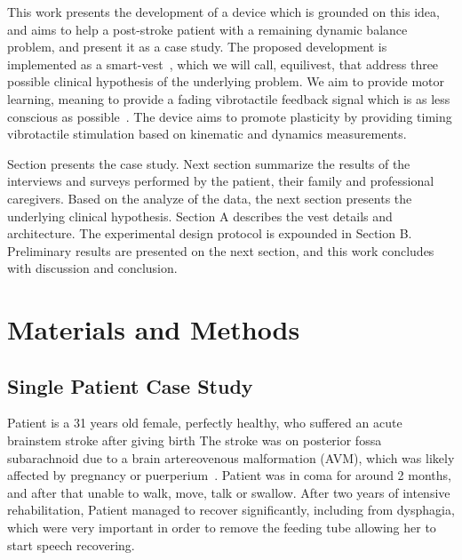 \documentclass[conference]{IEEEtran}
\begin{document}
This work presents the development of a device which is grounded on this idea, and aims to help a post-stroke patient with a remaining dynamic balance problem, and present it as a case study.  The proposed development is implemented as a smart-vest~\cite{Brandebusemeyer.etal2021}, which we will call, equilivest, that address three possible clinical hypothesis of the underlying problem.  We aim to provide motor learning, meaning to provide a fading vibrotactile feedback signal which is as less conscious as possible~\cite{Donato.etal2016}.  The device aims to promote plasticity by providing timing vibrotactile stimulation based on kinematic and dynamics measurements.  



Section presents the case study.  Next section summarize the results of the interviews and surveys performed by the patient, their family and professional caregivers.  Based on the analyze of the data, the next section presents the underlying clinical hypothesis. Section A describes the vest details and architecture.  The experimental design protocol is expounded in Section B.  Preliminary results are presented on the next section, and this work concludes with discussion and conclusion.

\section{Materials and Methods}

\subsection{Single Patient Case Study}

Patient is a 31 years old female, perfectly healthy, who suffered an acute brainstem stroke after giving birth  The stroke was on posterior fossa subarachnoid due to a brain artereovenous malformation (AVM), which was likely affected by pregnancy or puerperium~\cite{Porras.etal2017}.  Patient was in coma for around 2 months, and after that unable to walk, move, talk or swallow.  After two years of intensive rehabilitation, Patient managed to recover significantly, including from dysphagia, which were very important in order to remove the feeding tube allowing her to start speech recovering.  
\end{document}
